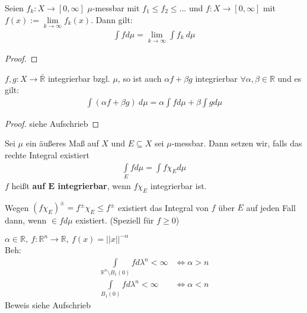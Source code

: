   \newpage
  \begin{theorem}
    Seien $f_k:X \to [0,\infty]$ $\mu$-messbar mit $f_1 \leq f_2 \leq ...$ und $f: X \to [0, \infty]$ mit $f(x) := \lim\limits_{k \to \infty} f_k(x)$. Dann gilt:
    \begin{align*}
      \int f d\mu = \lim\limits_{k \to \infty} \int f_k \ d\mu
    \end{align*}
  \end{theorem}

  \begin{proof}

  \end{proof}

  \begin{theorem}
    $f,g: X \to \bar{\mathbb{R}}$ integrierbar bzgl. $\mu$, so ist auch $\alpha f + \beta g$ integrierbar $\forall \alpha, \beta \in \mathbb{R}$ und es gilt:
    \begin{align*}
      \int (\alpha f + \beta g) \ d\mu = \alpha \int f d\mu + \beta \int g d\mu
    \end{align*}
  \end{theorem}

  \begin{proof}
    siehe Aufschrieb
  \end{proof}

  \begin{definition}
    Sei $\mu$ ein äußeres Maß auf $X$ und $E \subseteq X$ sei $\mu$-messbar. Dann setzen wir, falls das rechte Integral existiert
    \begin{align*}
      \int\limits_E f d\mu = \int f \chi_E d\mu
    \end{align*}
    $f$ heißt \textbf{auf $\bm{E}$ integrierbar}, wenn $f \chi_E$ integrierbar ist.
  \end{definition}

  \begin{remark}
    Wegen $(f \chi_E)^{\pm} = f^{\pm} \chi_E \leq f^{\pm}$ existiert das Integral von $f$ über $E$ auf jeden Fall dann, wenn $\in f d\mu$ existiert. (Speziell für $f \geq 0$)
  \end{remark}

  \begin{example}
    $\alpha \in \mathbb{R}, \ f:\mathbb{R}^n \to \mathbb{R}, \ f(x) = ||x||^{-\alpha}$\\
    Beh: 
    \begin{align*}
      \int\limits_{\mathbb{R}^n \setminus B_1(0)} f d\lambda^n < \infty &\Leftrightarrow \alpha > n\\
      \int\limits_{B_1(0)} f d\lambda^n < \infty &\Leftrightarrow \alpha < n
    \end{align*}
    Beweis siehe Aufschrieb
  \end{example}

